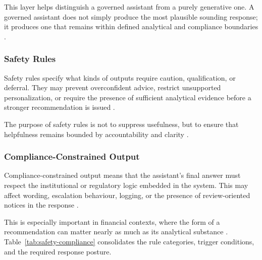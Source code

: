\documentclass[11pt]{article}
\begin{document}
This layer helps distinguish a governed assistant from a purely generative one. A governed assistant does not simply produce the most plausible sounding response; it produces one that remains within defined analytical and compliance boundaries \cite{ji2023,adadi2018}.

\subsubsection{Safety Rules}
Safety rules specify what kinds of outputs require caution, qualification, or deferral. They may prevent overconfident advice, restrict unsupported personalization, or require the presence of sufficient analytical evidence before a stronger recommendation is issued \cite{amershi2014,holzinger2016}.

The purpose of safety rules is not to suppress usefulness, but to ensure that helpfulness remains bounded by accountability and clarity \cite{aiact2024,gdpr2016}.

\subsubsection{Compliance-Constrained Output}
Compliance-constrained output means that the assistant's final answer must respect the institutional or regulatory logic embedded in the system. This may affect wording, escalation behaviour, logging, or the presence of review-oriented notices in the response \cite{mifid2014,basel2011,aiact2024}.

This is especially important in financial contexts, where the form of a recommendation can matter nearly as much as its analytical substance \cite{adadi2018,arrieta2020}. Table~\ref{tab:safety-compliance} consolidates the rule categories, trigger conditions, and the required response posture.
\end{document}
